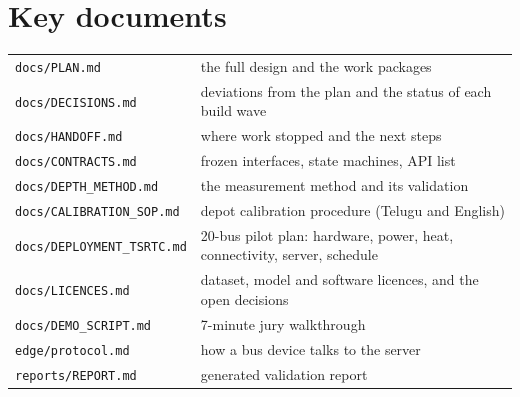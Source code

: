 \documentclass[11pt,a4paper]{article}
\newcommand{\code}[1]{\texttt{\small #1}}
\begin{document}
\appendix
\section{Key documents}
\begin{tabularx}{\textwidth}{@{}l X@{}}
\toprule
\code{docs/PLAN.md} & the full design and the work packages\\
\code{docs/DECISIONS.md} & deviations from the plan and the status of each build wave\\
\code{docs/HANDOFF.md} & where work stopped and the next steps\\
\code{docs/CONTRACTS.md} & frozen interfaces, state machines, API list\\
\code{docs/DEPTH\_METHOD.md} & the measurement method and its validation\\
\code{docs/CALIBRATION\_SOP.md} & depot calibration procedure (Telugu and English)\\
\code{docs/DEPLOYMENT\_TSRTC.md} & 20-bus pilot plan: hardware, power, heat, connectivity, server, schedule\\
\code{docs/LICENCES.md} & dataset, model and software licences, and the open decisions\\
\code{docs/DEMO\_SCRIPT.md} & 7-minute jury walkthrough\\
\code{edge/protocol.md} & how a bus device talks to the server\\
\code{reports/REPORT.md} & generated validation report\\
\bottomrule
\end{tabularx}
\end{document}
